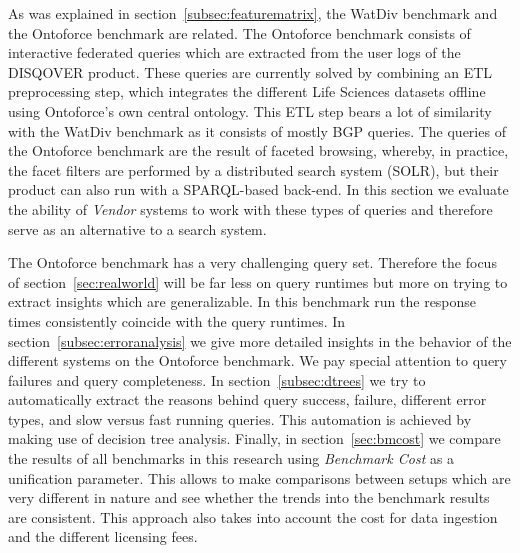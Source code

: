 

As was explained in section~\ref{subsec:featurematrix}, the WatDiv benchmark and the Ontoforce benchmark are related. The Ontoforce benchmark consists of interactive federated queries which are extracted from the user logs of the DISQOVER product. These queries are currently solved by combining an ETL preprocessing step, which integrates the different Life Sciences datasets offline using Ontoforce's own central ontology. This ETL step bears a lot of similarity with the WatDiv benchmark as it consists of mostly BGP queries. The queries of the Ontoforce benchmark are the result of faceted browsing, whereby, in practice, the facet filters are performed by a distributed search system (SOLR), but their product can also run with a SPARQL-based back-end. In this section we evaluate the ability of \emph{Vendor} systems to work with these types of queries and therefore serve as an alternative to a search system.

The Ontoforce benchmark has a very challenging query set. Therefore the focus of section~\ref{sec:realworld} will be far less on query runtimes but more on trying to extract insights which are generalizable. In this benchmark run the response times consistently coincide with the query runtimes.  
In section~\ref{subsec:erroranalysis} we give more detailed insights in the behavior of the different systems on the Ontoforce benchmark. We pay special attention to query failures and query completeness.
In section~\ref{subsec:dtrees} we try to automatically extract the reasons behind query success, failure, different error types, and slow versus fast running queries. This automation is achieved by making use of decision tree analysis.
Finally, in section~\ref{sec:bmcost} we compare the results of all benchmarks in this research using \emph{Benchmark Cost} as a unification parameter. This allows to make comparisons between setups which are very different in nature and see whether the trends into the benchmark results are consistent. This approach also takes into account the cost for data ingestion and the different licensing fees.


